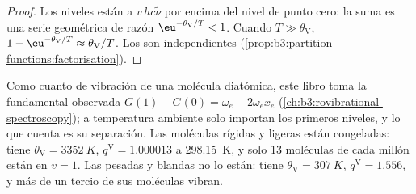 \begin{proof}
Los niveles están a $v\,hc\tilde\nu$ por encima del nivel de punto cero: la suma es una serie geométrica
de razón $\eu^{-\theta_{\mathrm V}/T} < 1$. Cuando $T \gg \theta_{\mathrm V}$, $1 - \eu^{-\theta_{\mathrm V}/T} \approx \theta_{\mathrm V}/T$.
Los  son independientes (\cref{prop:b3:partition-functions:factorisation}).
\end{proof}

Como cuanto de vibración de una molécula diatómica, este libro toma la
fundamental observada $G(1) - G(0) = \omega_e - 2\omega_ex_e$
(\cref{ch:b3:rovibrational-spectroscopy}); a temperatura ambiente solo importan los primeros
niveles, y lo que cuenta es su separación. Las moléculas rígidas y ligeras están
congeladas:  tiene $\theta_{\mathrm V} = \qty{3352}{K}$, $q^{\mathrm V} = 1.000013$ a \qty{298.15}{K}, y
solo 13 moléculas de cada millón están en $v = 1$. Las pesadas y blandas no lo están: 
tiene $\theta_{\mathrm V} = \qty{307}{K}$, $q^{\mathrm V} = 1.556$, y más de un tercio de sus moléculas
vibran.

